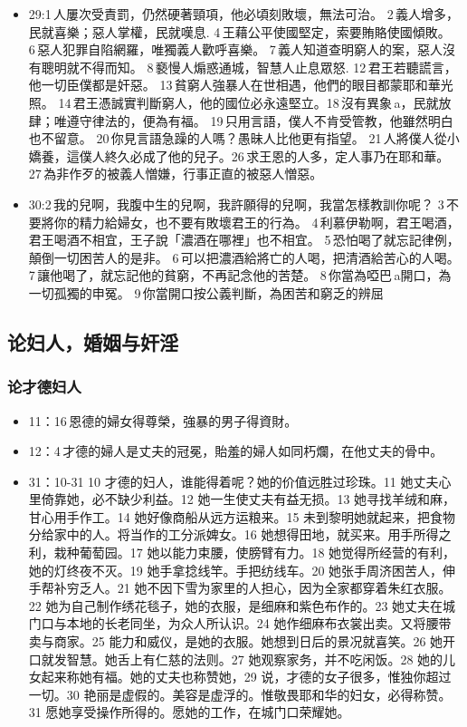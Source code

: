 \begin{itemize}
\item  29:1 人屢次受責罰，仍然硬著頸項，他必頃刻敗壞，無法可治。 2 義人增多，民就喜樂；惡人掌權，民就嘆息. 4 王藉公平使國堅定，索要賄賂使國傾敗。6 惡人犯罪自陷網羅，唯獨義人歡呼喜樂。 7 義人知道查明窮人的案，惡人沒有聰明就不得而知。 8 褻慢人煽惑通城，智慧人止息眾怒. 12 君王若聽謊言，他一切臣僕都是奸惡。 13 貧窮人強暴人在世相遇，他們的眼目都蒙耶和華光照。 14 君王憑誠實判斷窮人，他的國位必永遠堅立。18 沒有異象 a，民就放肆；唯遵守律法的，便為有福。 19 只用言語，僕人不肯受管教，他雖然明白也不留意。 20 你見言語急躁的人嗎？愚昧人比他更有指望。 21 人將僕人從小嬌養，這僕人終久必成了他的兒子。26 求王恩的人多，定人事乃在耶和華。 27 為非作歹的被義人憎嫌，行事正直的被惡人憎惡。
\item  30:2 我的兒啊，我腹中生的兒啊，我許願得的兒啊，我當怎樣教訓你呢？ 3 不要將你的精力給婦女，也不要有敗壞君王的行為。 4 利慕伊勒啊，君王喝酒，君王喝酒不相宜，王子說「濃酒在哪裡」也不相宜。 5 恐怕喝了就忘記律例，顛倒一切困苦人的是非。 6 可以把濃酒給將亡的人喝，把清酒給苦心的人喝。 7 讓他喝了，就忘記他的貧窮，不再記念他的苦楚。 8 你當為啞巴 a開口，為一切孤獨的申冤。 9 你當開口按公義判斷，為困苦和窮乏的辨屈
\end{itemize}

\subsection{论妇人，婚姻与奸淫}
\subsubsection{论才德妇人}
\begin{itemize}
\itemsep-.45em 
\item 11：16 恩德的婦女得尊榮，強暴的男子得資財。
\item 12：4 才德的婦人是丈夫的冠冕，貽羞的婦人如同朽爛，在他丈夫的骨中。
\item 31：10-31 10 才德的妇人，谁能得着呢？她的价值远胜过珍珠。11 她丈夫心里倚靠她，必不缺少利益。12 她一生使丈夫有益无损。13 她寻找羊绒和麻，甘心用手作工。14 她好像商船从远方运粮来。15 未到黎明她就起来，把食物分给家中的人。将当作的工分派婢女。16 她想得田地，就买来。用手所得之利，栽种葡萄园。17 她以能力束腰，使膀臂有力。18 她觉得所经营的有利，她的灯终夜不灭。19 她手拿捻线竿。手把纺线车。20 她张手周济困苦人，伸手帮补穷乏人。21 她不因下雪为家里的人担心，因为全家都穿着朱红衣服。22 她为自己制作绣花毯子，她的衣服，是细麻和紫色布作的。23 她丈夫在城门口与本地的长老同坐，为众人所认识。24 她作细麻布衣裳出卖。又将腰带卖与商家。25 能力和威仪，是她的衣服。她想到日后的景况就喜笑。26 她开口就发智慧。她舌上有仁慈的法则。27 她观察家务，并不吃闲饭。28 她的儿女起来称她有福。她的丈夫也称赞她，29 说，才德的女子很多，惟独你超过一切。30 艳丽是虚假的。美容是虚浮的。惟敬畏耶和华的妇女，必得称赞。31 愿她享受操作所得的。愿她的工作，在城门口荣耀她。
\end{itemize}

